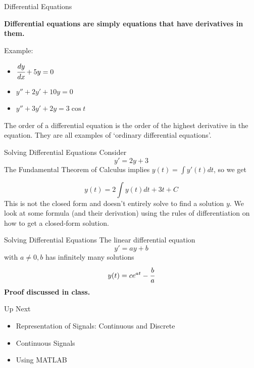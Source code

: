 \documentclass[aspectratio=169,xcolor=dvipsnames,svgnames,x11names,fleqn]{beamer}
\begin{document}
\begin{frame}{Differential Equations}
    \begin{center}
        \bf
        Differential equations are simply equations that have derivatives in them.
    \end{center}
Example:
\begin{itemize}
    \item $\cfrac{dy}{dx} +  5 y = 0$
    \item $y'' + 2y' + 10 y  = 0$
    \item $y'' + 3y' + 2y = 3\cos t$
    
\end{itemize}
    The order of a differential equation is the order of the highest derivative in the equation. They are all examples of `ordinary differential equations'.
\end{frame}


\begin{frame}{Solving Differential Equations}
    Consider 
    $$
    y' = 2y + 3
    $$
    The Fundamental Theorem of Calculus implies $y(t) = \int y'(t) dt$, so we get

    $$
    y(t) = 2\int y(t) dt + 3t + C
    $$
    This is not the closed form and doesn't entirely solve to find a solution $y$. We look at some formula (and their derivation) using the rules of differentiation on how to get a closed-form solution.
\end{frame}

\begin{frame}{Solving Differential Equations}
    The linear differential equation 
    $$
    y' = ay + b
    $$
    with $ a \neq 0, b$ has infinitely many solutions 
    $$
    y(t)= c e^{at}  - \cfrac{b}{a}
    $$
    \bf Proof discussed in class.
    
    \end{frame}

\begin{frame}{Up Next}
\begin{itemize}
    \item Representation of Signals: Continuous and Discrete
    \item Continuous Signals
    \item Using MATLAB
\end{itemize}
    
\end{frame}


\end{document}
